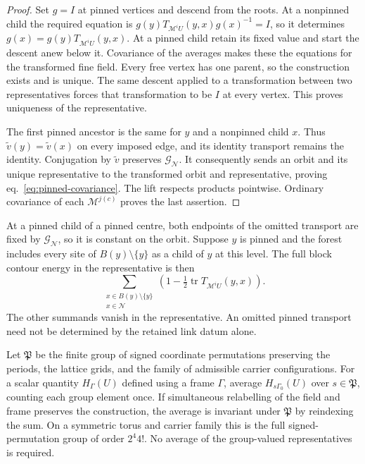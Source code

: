\documentclass[11pt,letterpaper,reqno]{amsart}
\numberwithin{equation}{section}
\renewcommand{\eqref}[1]{\textup{eq.~\ref{#1}}}
\theoremstyle{definition}
\theoremstyle{remark}
\begin{document}
\begin{proof}
Set $g=I$ at pinned vertices and descend from the roots. At a nonpinned
child the required equation is
$g(y)T_{\mathcal M^iU}(y,x)g(x)^{-1}=I$, so it determines
$g(x)=g(y)T_{\mathcal M^iU}(y,x)$. At a pinned child retain its fixed
value and start the descent anew below it. Covariance of the averages
makes these the equations for the transformed fine field. Every free
vertex has one parent, so the construction exists and is unique.
The same descent applied to a transformation between two representatives
forces that transformation to be $I$ at every vertex. This proves
uniqueness of the representative.

The first pinned ancestor is the same for $y$ and a nonpinned child $x$.
Thus $\widetilde v(y)=\widetilde v(x)$ on every imposed edge, and its
identity transport remains the identity. Conjugation by
$\widetilde v$ preserves $\mathcal G_{\mathcal N}$. It consequently
sends an orbit and its unique representative to the transformed orbit
and representative, proving \eqref{eq:pinned-covariance}. The lift
respects products pointwise. Ordinary covariance of each
$\mathcal M^{j(c)}$ proves the last assertion.
\end{proof}

At a pinned child of a pinned centre, both endpoints of the omitted
transport are fixed by $\mathcal G_{\mathcal N}$, so it is constant
on the orbit. Suppose $y$ is pinned and the forest includes every
site of $B(y)\setminus\{y\}$ as a child of $y$ at this level.
The full block contour energy in the representative is then
\begin{equation}\label{eq:pinned-residual-energy}
 \sum_{\substack{x\in B(y)\setminus\{y\}\\x\in\mathcal N}}
       \left(1-\tfrac12\operatorname{tr}T_{\mathcal M^iU}(y,x)\right).
\end{equation}
The other summands vanish in the representative. An omitted pinned
transport need not be determined by the retained link datum alone.

Let \(\mathfrak P\) be the finite group of signed coordinate
permutations preserving the periods, the lattice grids, and the
family of admissible carrier configurations. For a scalar quantity
\(H_\Gamma(U)\) defined using a frame \(\Gamma\), average
\(H_{s\Gamma_0}(U)\) over \(s\in\mathfrak P\), counting each group
element once. If simultaneous relabelling of the field and frame
preserves the construction, the average is invariant under
\(\mathfrak P\) by reindexing the sum. On a symmetric torus and
carrier family this is the full signed-permutation group of order
\(2^4 4!\). No average of the group-valued representatives is required.
\end{document}
